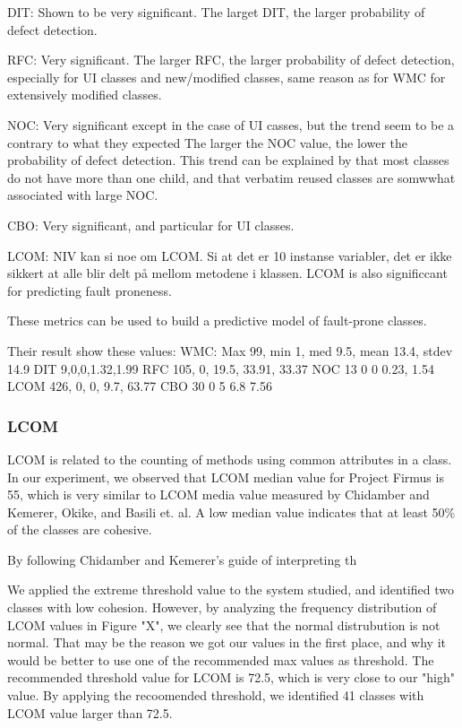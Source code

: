 DIT: Shown to be very significant. The larget DIT, the larger probability of defect detection.

RFC: Very significant. The larger RFC, the larger probability of defect detection, especially for UI classes and new/modified classes, same reason as for WMC for extensively modified classes.

NOC: Very significant except in the case of UI casses, but the trend seem to be a contrary to what they expected The larger the NOC value, the lower the probability of defect detection. This trend can be explained by that most classes do not have more than one child, and that verbatim reused classes are somwwhat associated with large NOC.

CBO: Very significant, and particular for UI classes.

LCOM: NIV kan si noe om LCOM. Si at det er 10 instanse variabler, det er ikke sikkert at alle blir delt på mellom metodene i klassen. LCOM is also significcant for predicting fault proneness.

These metrics can be used to build a predictive model of fault-prone classes.

Their result show these values:
WMC: Max 99, min 1, med 9.5, mean 13.4, stdev 14.9
DIT 9,0,0,1.32,1.99
RFC 105, 0, 19.5, 33.91, 33.37
NOC 13 0 0 0.23, 1.54
LCOM 426, 0, 0, 9.7, 63.77
CBO 30 0 5 6.8 7.56



\subsubsection{LCOM}
LCOM is related to the counting of methods using common attributes in a class. In our experiment, we observed that LCOM median value for Project Firmus is 55, which is very similar to LCOM media value measured by Chidamber and Kemerer\cite{chidamber1994metrics}, Okike\cite{okike2010pedagogical}, and Basili et. al\cite{basili1996validation}. A low median value indicates that at least 50\% of the classes are cohesive.

By following Chidamber and Kemerer's guide of interpreting th



 We applied the extreme threshold value to the system studied, and identified two classes with low cohesion. However, by analyzing the frequency distribution of LCOM values in Figure "X", we clearly see that the normal distrubution is not normal. That may be the reason we got our values in the first place, and why it would be better to use one of the recommended max values as threshold. The recommended threshold value for LCOM is 72.5, which is very close to our "high" value. By applying the recoomended threshold, we identified 41 classes with LCOM value larger than 72.5. 

